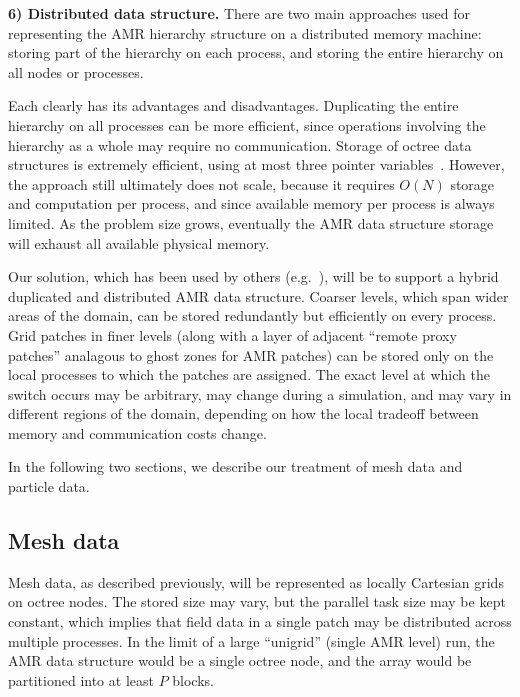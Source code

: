 \documentclass[10pt]{article}
\begin{document}

\textbf{6) Distributed data structure.} There are two main approaches
used for representing the AMR hierarchy structure on a distributed
memory machine: storing part of the hierarchy on each process, and
storing the entire hierarchy on all nodes or processes.

Each clearly has its advantages and disadvantages.  Duplicating the
entire hierarchy on all processes can be more efficient, since
operations involving the hierarchy as a whole may require no
communication.  Storage of octree data structures is extremely
efficient, using at most three pointer variables~\cite{@@@}.  However,
the approach still ultimately does not scale, because it requires
$O(N)$ storage and computation per process, and since available memory
per process is always limited.  As the problem size grows, eventually
the AMR data structure storage will exhaust all available physical
memory.

Our solution, which has been used by others
(e.g.~\cite{@@@hybrid-storage}), will be to support a hybrid
duplicated and distributed AMR data structure.  Coarser levels, which
span wider areas of the domain, can be stored redundantly but
efficiently on every process.  Grid patches in finer levels (along
with a layer of adjacent ``remote proxy patches'' analagous to ghost
zones for AMR patches) can be stored only on the local processes to
which the patches are assigned.  The exact level at which the switch
occurs may be arbitrary, may change during a simulation, and may vary
in different regions of the domain, depending on how the local tradeoff
between memory and communication costs change.

In the following two sections, we describe our treatment of mesh data
and particle data.

\subsection{Mesh data} \label{ss:design-fields}

Mesh data, as described previously, will be represented as locally
Cartesian grids on octree nodes.  The stored size may vary, but the
parallel task size may be kept constant, which implies that field data
in a single patch may be distributed across multiple processes.  In
the limit of a large ``unigrid'' (single AMR level) run, the AMR data
structure would be a single octree node, and the array would be
partitioned into at least $P$ blocks.
\end{document}

